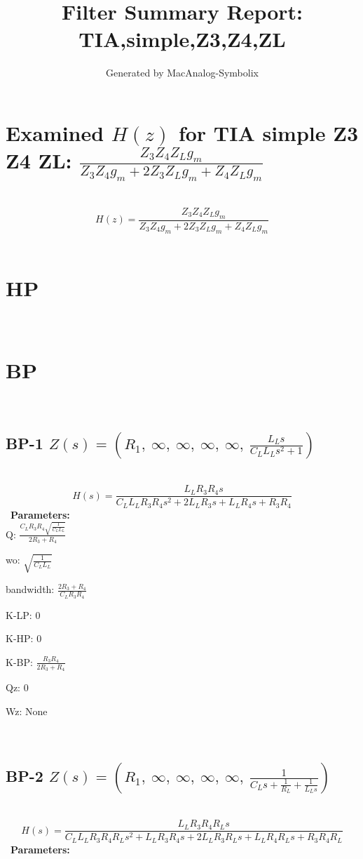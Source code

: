 \documentclass{article}
\begin{document}
        
                        \title{Filter Summary Report: TIA,simple,Z3,Z4,ZL}
                        \author{Generated by MacAnalog-Symbolix}
                        \maketitle

                        \tableofcontents
                        \newpage
                        \section{Examined $H(z)$ for TIA simple Z3 Z4 ZL: $\frac{Z_{3} Z_{4} Z_{L} g_{m}}{Z_{3} Z_{4} g_{m} + 2 Z_{3} Z_{L} g_{m} + Z_{4} Z_{L} g_{m}}$ }\ 
\textbf{\[H(z) = \frac{Z_{3} Z_{4} Z_{L} g_{m}}{Z_{3} Z_{4} g_{m} + 2 Z_{3} Z_{L} g_{m} + Z_{4} Z_{L} g_{m}}\] }\ 
\section{HP}\ 
\section{BP}\ 
\subsection{BP-1 $Z(s) = \left( R_{1}, \  \infty, \  \infty, \  \infty, \  \infty, \  \frac{L_{L} s}{C_{L} L_{L} s^{2} + 1}\right)$ } \ 
\textbf{\[H(s) = \frac{L_{L} R_{3} R_{4} s}{C_{L} L_{L} R_{3} R_{4} s^{2} + 2 L_{L} R_{3} s + L_{L} R_{4} s + R_{3} R_{4}}\] } \ 
\textbf{Parameters:}\\ 

Q: $\frac{C_{L} R_{3} R_{4} \sqrt{\frac{1}{C_{L} L_{L}}}}{2 R_{3} + R_{4}}$\ 

wo: $\sqrt{\frac{1}{C_{L} L_{L}}}$\ 

bandwidth: $\frac{2 R_{3} + R_{4}}{C_{L} R_{3} R_{4}}$\ 

K-LP: $0$\ 

K-HP: $0$\ 

K-BP: $\frac{R_{3} R_{4}}{2 R_{3} + R_{4}}$\ 

Qz: $0$\ 

Wz: $\text{None}$\ 

\ 

\subsection{BP-2 $Z(s) = \left( R_{1}, \  \infty, \  \infty, \  \infty, \  \infty, \  \frac{1}{C_{L} s + \frac{1}{R_{L}} + \frac{1}{L_{L} s}}\right)$ } \ 
\textbf{\[H(s) = \frac{L_{L} R_{3} R_{4} R_{L} s}{C_{L} L_{L} R_{3} R_{4} R_{L} s^{2} + L_{L} R_{3} R_{4} s + 2 L_{L} R_{3} R_{L} s + L_{L} R_{4} R_{L} s + R_{3} R_{4} R_{L}}\] } \ 
\textbf{Parameters:}\\ 
\end{document}
